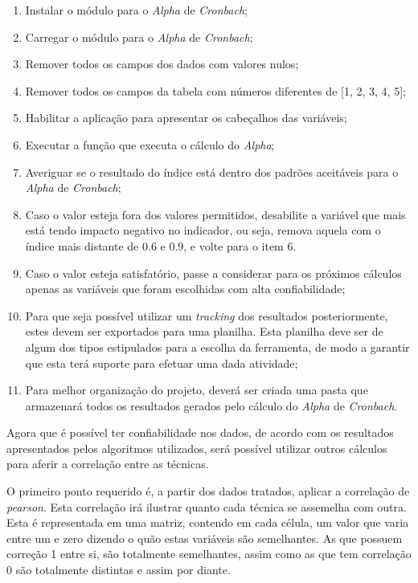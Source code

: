 \begin{enumerate}
    \item Instalar o módulo para o \textit{Alpha} de \textit{Cronbach};
    \item Carregar o módulo para o \textit{Alpha} de \textit{Cronbach};
    \item Remover todos os campos dos dados com valores nulos;
    \item Remover todos os campos da tabela com números diferentes de [1, 2, 3, 4, 5];
    \item Habilitar a aplicação para apresentar os cabeçalhos das variáveis;
    \item Executar a função que executa o cálculo do \textit{Alpha};
    \item Averiguar se o resultado do índice está dentro dos padrões aceitáveis para o \textit{Alpha} de \textit{Cronbach};
    \item Caso o valor esteja fora dos valores permitidos, desabilite a variável que mais está tendo impacto negativo no indicador,
        ou seja, remova aquela com o índice mais distante de 0.6 e 0.9, e volte para o item 6.
    \item Caso o valor esteja satisfatório, passe a considerar para os próximos cálculos apenas as variáveis que foram
        escolhidas com alta confiabilidade;
    \item Para que seja possível utilizar um \textit{tracking} dos resultados posteriormente, estes devem ser exportados para uma planilha.
        Esta planilha deve ser de algum dos tipos estipulados para a escolha da ferramenta, de modo a garantir que esta terá suporte
        para efetuar uma dada atividade;
    \item Para melhor organização do projeto, deverá ser criada uma pasta que armazenará todos os resultados gerados pelo cálculo do \textit{Alpha}
        de \textit{Cronbach}.
\end{enumerate}

Agora que é possível ter confiabilidade nos dados, de acordo com os resultados apresentados pelos algoritmos utilizados, será
possível
utilizar outros cálculos para aferir a correlação entre as técnicas.

O primeiro ponto requerido é, a partir dos dados tratados, aplicar a correlação de \textit{pearson}. Esta correlação irá ilustrar
quanto cada técnica se assemelha com outra. Esta é representada em uma matriz, contendo em cada célula, um valor que varia entre um
e zero dizendo o quão estas variáveis são semelhantes. As que possuem correção 1 entre si, são totalmente semelhantes, assim como as que tem
correlação 0 são totalmente distintas e assim por diante.

